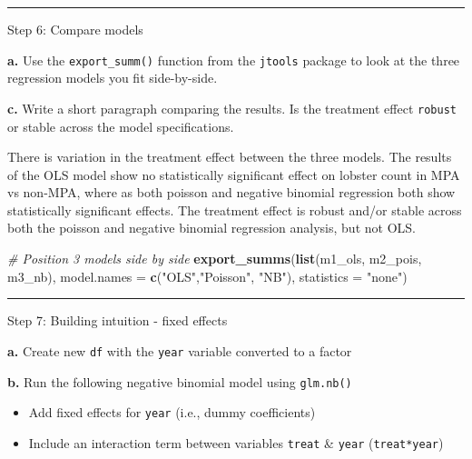\documentclass[
]{article}
\newenvironment{Shaded}{\begin{snugshade}}{\end{snugshade}}
\newcommand{\AttributeTok}[1]{\textcolor[rgb]{0.13,0.29,0.53}{#1}}
\newcommand{\CommentTok}[1]{\textcolor[rgb]{0.56,0.35,0.01}{\textit{#1}}}
\newcommand{\FunctionTok}[1]{\textcolor[rgb]{0.13,0.29,0.53}{\textbf{#1}}}
\newcommand{\NormalTok}[1]{#1}
\newcommand{\StringTok}[1]{\textcolor[rgb]{0.31,0.60,0.02}{#1}}
\begin{document}
\begin{center}\rule{0.5\linewidth}{0.5pt}\end{center}

Step 6: Compare models

\textbf{a.} Use the \texttt{export\_summ()} function from the
\texttt{jtools} package to look at the three regression models you fit
side-by-side.

\textbf{c.} Write a short paragraph comparing the results. Is the
treatment effect \texttt{robust} or stable across the model
specifications.

There is variation in the treatment effect between the three models. The
results of the OLS model show no statistically significant effect on
lobster count in MPA vs non-MPA, where as both poisson and negative
binomial regression both show statistically significant effects. The
treatment effect is robust and/or stable across both the poisson and
negative binomial regression analysis, but not OLS.

\begin{Shaded}
\begin{Highlighting}[]
\CommentTok{\# Position 3 models side by side}
\FunctionTok{export\_summs}\NormalTok{(}\FunctionTok{list}\NormalTok{(m1\_ols, m2\_pois, m3\_nb),}
             \AttributeTok{model.names =} \FunctionTok{c}\NormalTok{(}\StringTok{"OLS"}\NormalTok{,}\StringTok{"Poisson"}\NormalTok{, }\StringTok{"NB"}\NormalTok{),}
             \AttributeTok{statistics =} \StringTok{"none"}\NormalTok{)}
\end{Highlighting}
\end{Shaded}

\begin{center}\rule{0.5\linewidth}{0.5pt}\end{center}

Step 7: Building intuition - fixed effects

\textbf{a.} Create new \texttt{df} with the \texttt{year} variable
converted to a factor

\textbf{b.} Run the following negative binomial model using
\texttt{glm.nb()}

\begin{itemize}
\item
  Add fixed effects for \texttt{year} (i.e., dummy coefficients)
\item
  Include an interaction term between variables \texttt{treat} \&
  \texttt{year} (\texttt{treat*year})
\end{itemize}
\end{document}
